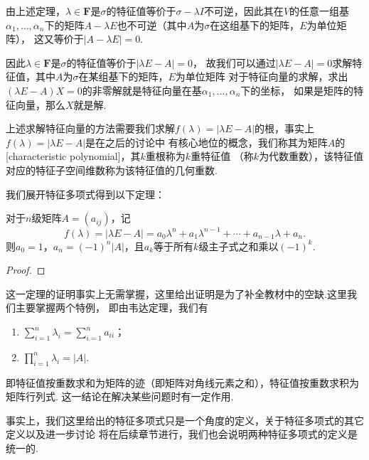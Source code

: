 由上述定理，$\lambda\in\mathbf{F}$是$\sigma$的特征值等价于$\sigma-\lambda I$不可逆，因此其在$V$的任意一组基
$\alpha_1,\ldots,\alpha_n$下的矩阵$A-\lambda E$也不可逆（其中$A$为$\sigma$在这组基下的矩阵，$E$为单位矩阵），
这又等价于$|A-\lambda E|=0$.

因此$\lambda\in\mathbf{F}$是$\sigma$的特征值等价于$|\lambda E-A|=0$，
故我们可以通过$|\lambda E-A|=0$求解特征值，其中$A$为$\sigma$在某组基下的矩阵，$E$为单位矩阵
对于特征向量的求解，求出$(\lambda E-A)X=0$的非零解就是特征向量在基$\alpha_1,\ldots,\alpha_n$下的坐标，
如果是矩阵的特征向量，那么$X$就是解.

上述求解特征向量的方法需要我们求解$f(\lambda)=|\lambda E-A|$的根，事实上$f(\lambda)=|\lambda E-A|$是在之后的讨论中
有核心地位的概念，我们称其为矩阵$A$的[characteristic polynomial]，其$k$重根称为$k$重特征值
（称$k$为代数重数），该特征值对应的特征子空间维数称为该特征值的几何重数.

我们展开特征多项式得到以下定理：
\begin{theorem}
    对于$n$级矩阵$A=(a_{ij})$，记
    \[f(\lambda)=|\lambda E-A|=a_0\lambda^n+a_1\lambda^{n-1}+\cdots+a_{n-1}\lambda+a_n.\]
    则$a_0=1$，$a_n=(-1)^n|A|$，且$a_k$等于所有$k$级主子式之和乘以$(-1)^k$.
\end{theorem}
\begin{proof}
    
\end{proof}

这一定理的证明事实上无需掌握，这里给出证明是为了补全教材中的空缺.这里我们主要掌握两个特例，
即由韦达定理，我们有
\begin{enumerate}
    \item $\displaystyle\sum_{i=1}^{n}\lambda_i=\displaystyle\sum_{i=1}^{n}a_{ii}$；
    \item $\displaystyle\prod_{i=1}^{n}\lambda_i=|A|$.
\end{enumerate}
即特征值按重数求和为矩阵的迹（即矩阵对角线元素之和），特征值按重数求积为矩阵行列式.
这一结论在解决某些问题时有一定作用.

事实上，我们这里给出的特征多项式只是一个角度的定义，关于特征多项式的其它定义以及进一步讨论
将在后续章节进行，我们也会说明两种特征多项式的定义是统一的.

